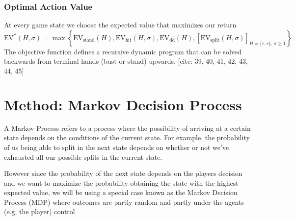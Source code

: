 \documentclass[12pt,a4paper]{cibb}
\begin{document}
\subsubsection*{Optimal Action Value}

At every game state we choose the expected value that maximizes our return
\begin{equation}
\mathrm{EV}^*(H, σ  ) =
\max \left\{
\mathrm{EV}_{\text{stand}}(H),
\mathrm{EV}_{\text{hit}}(H, σ  ),
\mathrm{EV}_{\text{dd}}(H),
\left[\mathrm{EV}_{\text{split}}(H, σ  )\right]_{H = \{r, r\},\, σ   \geq 1}
\right\}
\label{eq:OBJ_FUNCTION}
    \end{equation}
The objective function defines a recursive dynamic program that can be solved backwards from terminal hands (bust or stand) upwards. [cite: 39, 40, 41, 42, 43, 44, 45]

\section*{Method: Markov Decision Process }
A Markov Process refers to a process where the possibility of arriving at a certain state depends on the conditions of the current state. For example, the probability of us being able to split in the next state depends on whether or not we've exhausted all our possible splits in the current state.

However since the probability of the next state depends on the players decision and we want to maximize the probability obtaining the state with the highest expected value, we will be using a special case known as the Markov Decision Process (MDP) where outcomes are partly random and partly under the agents (e.g, the player) control
\end{document}
